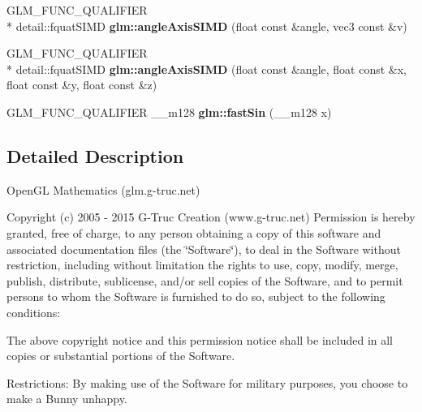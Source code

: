 \begin{DoxyCompactItemize}
\item 
\hypertarget{namespaceglm_a635900a97b69fe25d76c029f130a1c8f}{G\-L\-M\-\_\-\-F\-U\-N\-C\-\_\-\-Q\-U\-A\-L\-I\-F\-I\-E\-R \\*
detail\-::fquat\-S\-I\-M\-D {\bfseries glm\-::angle\-Axis\-S\-I\-M\-D} (float const \&angle, vec3 const \&v)}\label{namespaceglm_a635900a97b69fe25d76c029f130a1c8f}

\item 
\hypertarget{namespaceglm_a8ae8890bd658ce7217abc2112e3dca35}{G\-L\-M\-\_\-\-F\-U\-N\-C\-\_\-\-Q\-U\-A\-L\-I\-F\-I\-E\-R \\*
detail\-::fquat\-S\-I\-M\-D {\bfseries glm\-::angle\-Axis\-S\-I\-M\-D} (float const \&angle, float const \&x, float const \&y, float const \&z)}\label{namespaceglm_a8ae8890bd658ce7217abc2112e3dca35}

\item 
\hypertarget{namespaceglm_a81de908720e51f26e86e18d37aa5cc3b}{G\-L\-M\-\_\-\-F\-U\-N\-C\-\_\-\-Q\-U\-A\-L\-I\-F\-I\-E\-R \-\_\-\-\_\-m128 {\bfseries glm\-::fast\-Sin} (\-\_\-\-\_\-m128 x)}\label{namespaceglm_a81de908720e51f26e86e18d37aa5cc3b}

\end{DoxyCompactItemize}


\subsection{Detailed Description}
Open\-G\-L Mathematics (glm.\-g-\/truc.\-net)

Copyright (c) 2005 -\/ 2015 G-\/\-Truc Creation (www.\-g-\/truc.\-net) Permission is hereby granted, free of charge, to any person obtaining a copy of this software and associated documentation files (the \char`\"{}\-Software\char`\"{}), to deal in the Software without restriction, including without limitation the rights to use, copy, modify, merge, publish, distribute, sublicense, and/or sell copies of the Software, and to permit persons to whom the Software is furnished to do so, subject to the following conditions\-:

The above copyright notice and this permission notice shall be included in all copies or substantial portions of the Software.

Restrictions\-: By making use of the Software for military purposes, you choose to make a Bunny unhappy.

